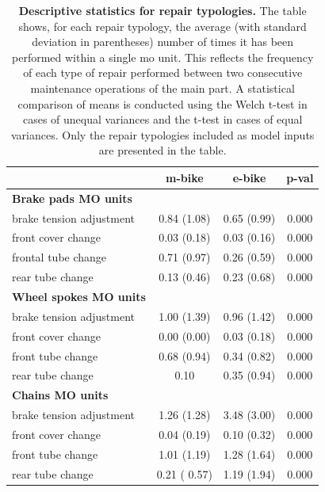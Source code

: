     \begin{table}[ht!]
        \centering
        \caption[Descriptive statistics for repair typologies]{
            \textbf{Descriptive statistics for repair typologies.}
            The table shows, for each repair typology, the average (with standard deviation in parentheses) number of times it has been performed within a single \ac{mo} unit. This reflects the frequency of each type of repair performed between two consecutive maintenance operations of the main part. A statistical comparison of 
            means is conducted using the Welch t-test in cases of unequal variances and the 
            t-test in cases of equal variances. Only the repair typologies included as model 
            inputs are presented in the table.
        }
        \label{tab:other_mos_mean}
        \begin{tabular}{@{}lccc@{}}
        \hline
            &  \textbf{m-bike} & \textbf{e-bike} & \textbf{p-val} \\
        \hline
        \textbf{Brake pads MO units}\\
            brake tension adjustment & 0.84 (1.08) & 0.65 (0.99) & 0.000 \\
            front cover change &  0.03 (0.18) &  0.03 (0.16) & 0.000 \\
            frontal tube change &  0.71 (0.97) &  0.26 (0.59) & 0.000\\
            rear tube change &  0.13 (0.46) &  0.23 (0.68) & 0.000\\
        \hline
        \textbf{Wheel spokes MO units}\\
            brake tension adjustment & 1.00 (1.39) & 0.96 (1.42) & 0.000 \\
            front cover change & 0.00 (0.00) & 0.03 (0.18) & 0.000 \\
            front tube change & 0.68 (0.94) & 0.34 (0.82) & 0.000 \\
            rear tube change & 0.10 & 0.35 (0.94) & 0.000 \\
        \hline
        \textbf{Chains MO units}\\
            brake tension adjustment & 1.26 (1.28) & 3.48 (3.00) & 0.000\\
            front cover change & 0.04 (0.19) & 0.10 (0.32) & 0.000 \\
            front tube change & 1.01 (1.19) & 1.28 (1.64) & 0.000 \\
            rear tube change & 0.21 ( 0.57) & 1.19 (1.94) & 0.000 \\
        \hline
        \end{tabular}
    \end{table}

